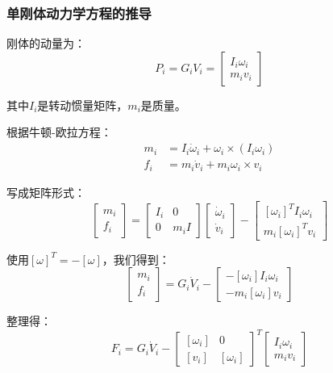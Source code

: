 \documentclass[12pt,a4paper]{article}
\begin{document}
\subsubsection{单刚体动力学方程的推导}

刚体的动量为：
\begin{equation}
P_i = G_i V_i = \begin{bmatrix}
I_i \omega_i \\
m_i v_i
\end{bmatrix}
\end{equation}

其中$I_i$是转动惯量矩阵，$m_i$是质量。

根据牛顿-欧拉方程：
\begin{align}
m_i &= I_i \dot{\omega}_i + \omega_i \times (I_i \omega_i) \\
f_i &= m_i \dot{v}_i + m_i \omega_i \times v_i
\end{align}

写成矩阵形式：
\begin{equation}
\begin{bmatrix}
m_i \\
f_i
\end{bmatrix} = \begin{bmatrix}
I_i & 0 \\
0 & m_i I
\end{bmatrix} \begin{bmatrix}
\dot{\omega}_i \\
\dot{v}_i
\end{bmatrix} - \begin{bmatrix}
[\omega_i]^T I_i \omega_i \\
m_i [\omega_i]^T v_i
\end{bmatrix}
\end{equation}

使用$[\omega]^T = -[\omega]$，我们得到：
\begin{equation}
\begin{bmatrix}
m_i \\
f_i
\end{bmatrix} = G_i \dot{V}_i - \begin{bmatrix}
-[\omega_i] I_i \omega_i \\
-m_i [\omega_i] v_i
\end{bmatrix}
\end{equation}

整理得：
\begin{equation}
F_i = G_i \dot{V}_i - \begin{bmatrix}
[\omega_i] & 0 \\
[v_i] & [\omega_i]
\end{bmatrix}^T \begin{bmatrix}
I_i \omega_i \\
m_i v_i
\end{bmatrix}
\end{equation}
\end{document}
